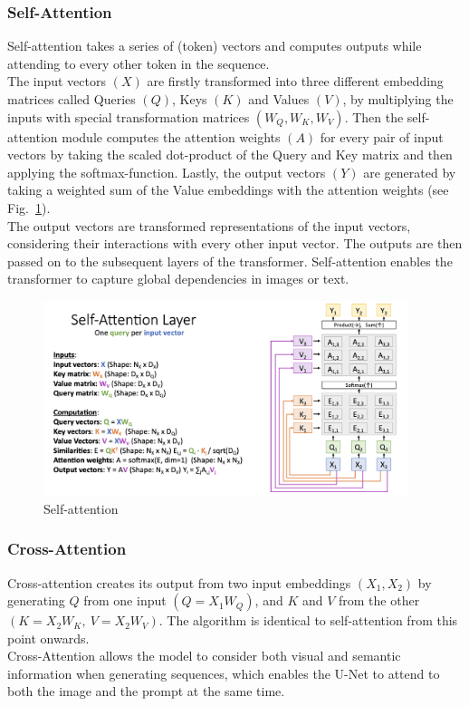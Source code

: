 \subsubsection*{Self-Attention}
Self-attention \cite{vaswani2017attention} takes a series of (token) vectors and computes outputs while attending to every other token in the sequence.\\
The input vectors \((X)\) are firstly transformed into three different embedding matrices called Queries \((Q)\), Keys \((K)\) and Values \((V)\),  by multiplying the inputs with special transformation matrices \((W_Q, W_K, W_V)\). Then the self-attention module computes the attention weights \((A)\) for every pair of input vectors by taking the scaled dot-product of the Query and Key matrix and then applying the softmax-function. Lastly, the output vectors \((Y)\) are generated by taking a weighted sum of the Value embeddings with the attention weights (see Fig.~\ref{fig:self-attn}).\\
The output vectors are transformed representations of the input vectors, considering their interactions with every other input vector. The outputs are then passed on to the subsequent layers of the transformer. Self-attention enables the transformer to capture global dependencies in images or text.
\begin{figure}[!htb]
\centering
\includegraphics[width=0.95\textwidth]
{static/self_attn.png}
\caption{Self-attention \cite{johnson2019attn}}
\label{fig:self-attn}
\end{figure}



\subsubsection*{Cross-Attention}
Cross-attention creates its output from two input embeddings \((X_1, X_2)\) by generating \(Q\) from one input \((Q=X_1W_Q)\), and 
\(K\) and \(V\) from the other \((K=X_2W_K,\ V=X_2W_V)\). The algorithm is identical to self-attention from this point onwards.\\ Cross-Attention allows the model to consider both visual and semantic information when generating sequences, which enables the U-Net to attend to both the image and the prompt at the same time.



